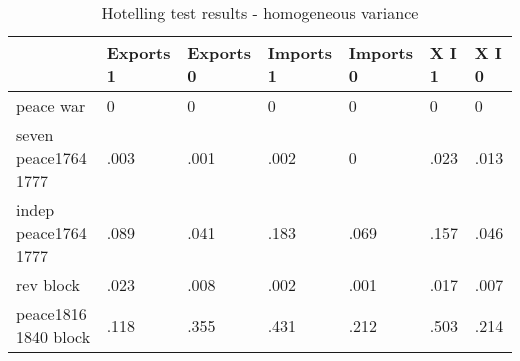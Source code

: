 \begin{table}[htbp]
\caption{\label{hotelling_test_hom} Hotelling test results - homogeneous variance}\centering\medskip
\begin{tabular}{|l|l|l|l|l|l|l|}\hline  
 & Exports 1  & Exports 0  & Imports 1  & Imports 0  & X I 1  & X I 0  \\ \hline  
peace war & 0 & 0 & 0 & 0 & 0 & 0 \\ \hline 
seven peace1764 1777 & .003 & .001 & .002 & 0 & .023 & .013 \\ \hline 
indep peace1764 1777 & .089 & .041 & .183 & .069 & .157 & .046 \\ \hline 
rev block & .023 & .008 & .002 & .001 & .017 & .007 \\ \hline 
peace1816 1840 block & .118 & .355 & .431 & .212 & .503 & .214 \\ \hline 
  \end{tabular}
\end{table}

